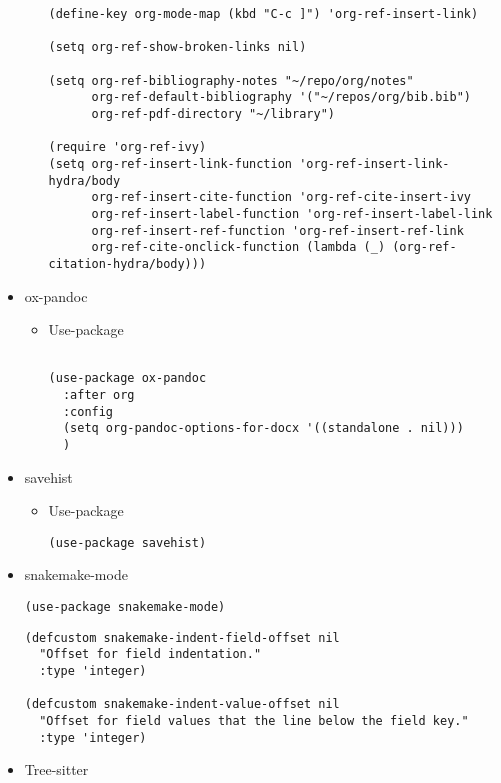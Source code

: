 \documentclass{article}
\begin{document}
\begin{itemize}
\begin{itemize}
\begin{verbatim}
(define-key org-mode-map (kbd "C-c ]") 'org-ref-insert-link)

(setq org-ref-show-broken-links nil)

(setq org-ref-bibliography-notes "~/repo/org/notes"
      org-ref-default-bibliography '("~/repos/org/bib.bib")
      org-ref-pdf-directory "~/library")

(require 'org-ref-ivy)
(setq org-ref-insert-link-function 'org-ref-insert-link-hydra/body
      org-ref-insert-cite-function 'org-ref-cite-insert-ivy
      org-ref-insert-label-function 'org-ref-insert-label-link
      org-ref-insert-ref-function 'org-ref-insert-ref-link
      org-ref-cite-onclick-function (lambda (_) (org-ref-citation-hydra/body)))

\end{verbatim}
\end{itemize}

\item ox-pandoc
\label{sec:org8238505}
\begin{itemize}
\item Use-package
\label{sec:orgde649ef}
\begin{verbatim}

(use-package ox-pandoc
  :after org
  :config
  (setq org-pandoc-options-for-docx '((standalone . nil)))
  )

\end{verbatim}
\end{itemize}

\item savehist
\label{sec:orgb9b9c9d}
\begin{itemize}
\item Use-package
\label{sec:orgbd6ef4d}
\begin{verbatim}
(use-package savehist)
\end{verbatim}
\end{itemize}

\item snakemake-mode
\label{sec:org561e60a}
\begin{verbatim}
(use-package snakemake-mode)
\end{verbatim}
\begin{verbatim}
(defcustom snakemake-indent-field-offset nil
  "Offset for field indentation."
  :type 'integer)

(defcustom snakemake-indent-value-offset nil
  "Offset for field values that the line below the field key."
  :type 'integer)
\end{verbatim}
\item Tree-sitter
\label{sec:org28b1e91}
\begin{verbatim}


\end{verbatim}
\end{itemize}
\end{document}
